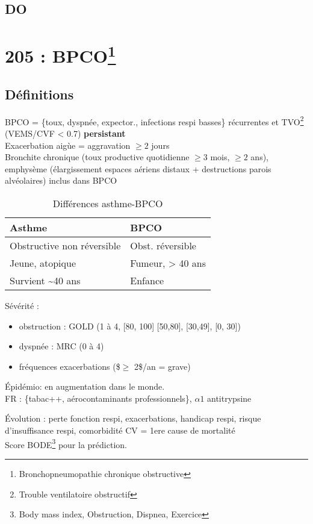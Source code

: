 \documentclass{article}
\begin{document}
\subsection{DO}

\section{205 : BPCO\footnote{Bronchopneumopathie chronique obstructive}}
\label{sec:205-bpco}

\subsection{Définitions}
BPCO = \{toux, dyspnée, expector., infections respi basses\} récurrentes et
TVO\footnote{Trouble ventilatoire obstructif} (VEMS/CVF < 0.7)
\textbf{persistant}\\
Exacerbation aigùe = aggravation \(\ge 2\) jours\\
Bronchite chronique (toux productive quotidienne \(\ge 3\) mois, \(\ge 2\) ans),
emphysème (élargissement espaces aériens distaux + destructions parois
alvéolaires) inclus dans BPCO\\
\begin{table}[htbp]
\caption{Différences asthme-BPCO}
\centering
\begin{tabular}{ll}
\toprule
Asthme & BPCO\\
\midrule
Obstructive non réversible & Obst. réversible\\
Jeune, atopique & Fumeur, > 40 ans\\
Survient \textasciitilde{}40 ans & Enfance\\
\bottomrule
\end{tabular}
\end{table}

Sévérité : 
\begin{itemize}
\item obstruction : GOLD (1 à 4, [80, 100] [50,80], [30,49], [0, 30])
\item dyspnée : MRC (0 à 4)
\item fréquences exacerbations (\$\(\ge\) 2\$/an = grave)
\end{itemize}

Épidémio: en augmentation dans le monde. \\
FR : \{tabac++, aérocontaminants professionnels\}, \(\alpha{}1\) antitrypsine

Évolution : perte fonction respi, exacerbations, handicap respi, risque
d'insuffisance respi, comorbidité CV = 1ere cause de mortalité\\
Score BODE\footnote{Body mass index, Obstruction, Dispnea, Exercice} pour la prédiction.
\end{document}
